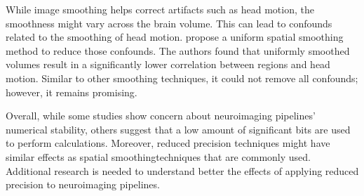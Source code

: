 While image smoothing helps correct artifacts such as head motion, the smoothness might vary across the brain volume.
This can lead to confounds related to the smoothing of head motion.
\cite{Scheinost2014-ds} propose a uniform spatial smoothing method
to reduce those confounds.
The authors found that uniformly smoothed volumes result in a significantly lower
correlation between regions and head motion.
Similar to other smoothing techniques, it could not remove all confounds; however, it remains promising. 
	
Overall, while some studies show concern about neuroimaging pipelines' numerical stability,
others suggest that a low amount of significant bits are used to perform calculations. 
Moreover, reduced precision techniques might have similar effects as spatial smoothingtechniques that are commonly used.
Additional research is needed to understand better the effects of applying reduced precision to neuroimaging pipelines.
